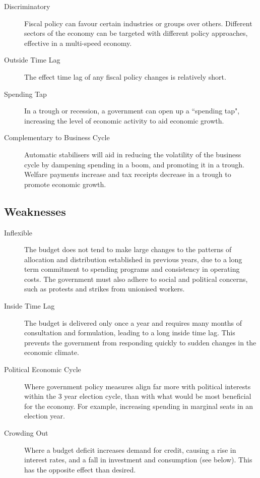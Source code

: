 \documentclass[a4paper,11pt]{report}
\begin{document}
\begin{description}
\item [Discriminatory] Fiscal policy can favour certain industries or groups
	over others. Different sectors of the economy can be targeted with different
	policy approaches, effective in a multi-speed economy.
\item [Outside Time Lag] The effect time lag of any fiscal policy changes
	is relatively short.
\item [Spending Tap] In a trough or recession, a government can open up a
	``spending tap", increasing the level of economic activity to aid economic
	growth.
\item [Complementary to Business Cycle] Automatic stabilisers will aid in
	reducing the volatility of the business cycle by dampening spending in a
	boom, and promoting it in a trough. Welfare payments increase and tax
	receipts decrease in a trough to promote economic growth.
\end{description}

\subsection{Weaknesses}

\begin{description}
\item [Inflexible] The budget does not tend to make large changes to the
	patterns of allocation and distribution established in previous years, due
	to a long term commitment to spending programs and consistency in operating
	costs. The government must also adhere to social and political concerns,
	such as protests and strikes from unionised workers.
\item [Inside Time Lag] The budget is delivered only once a year and requires
	many months of consultation and formulation, leading to a long inside time
	lag. This prevents the government from responding quickly to sudden changes
	in the economic climate.
\item [Political Economic Cycle] Where government policy measures align far more
	with political interests within the 3 year election cycle, than with what
	would be most beneficial for the economy. For example, increasing spending
	in marginal seats in an election year.
\item [Crowding Out] Where a budget deficit increases demand for credit, causing
	a rise in interest rates, and a fall in investment and consumption (see
	below). This has the opposite effect than desired.
\end{description}
\end{document}
